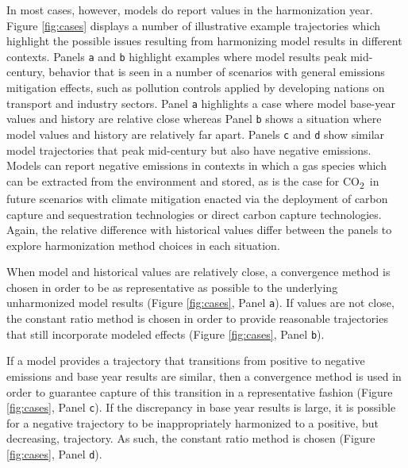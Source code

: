 \documentclass[review]{elsarticle}
\newcommand{\code}[1]{\lstinline[basicstyle=\ttfamily\color{black}]|#1|}
\newcommand{\cotwo}{CO\textsubscript{2}~}
\begin{document}
In most cases, however, models do report values in the harmonization
year. Figure \ref{fig:cases} displays a number of illustrative example
trajectories which highlight the possible issues resulting from harmonizing
model results in different contexts. Panels \code{a} and \code{b} highlight
examples where model results peak mid-century, behavior that is seen in a number
of scenarios with general emissions mitigation effects, such as pollution
controls applied by developing nations on transport and industry sectors. Panel
\code{a} highlights a case where model base-year values and history are relative
close whereas Panel \code{b} shows a situation where model values and history
are relatively far apart. Panels \code{c} and \code{d} show similar model
trajectories that peak mid-century but also have negative emissions. Models can
report negative emissions in contexts in which a gas species which can be
extracted from the environment and stored, as is the case for \cotwo in future
scenarios with climate mitigation enacted via the deployment of carbon capture
and sequestration technologies or direct carbon capture technologies. Again, the
relative difference with historical values differ between the panels to explore
harmonization method choices in each situation.

When model and historical values are relatively close, a convergence method is
chosen in order to be as representative as possible to the underlying
unharmonized model results (Figure \ref{fig:cases}, Panel \code{a}). If values
are not close, the constant ratio method is chosen in order to provide
reasonable trajectories that still incorporate modeled effects (Figure
\ref{fig:cases}, Panel \code{b}).

If a model provides a trajectory that transitions from positive to negative
emissions and base year results are similar, then a convergence method is used
in order to guarantee capture of this transition in a representative fashion
(Figure \ref{fig:cases}, Panel \code{c}). If the discrepancy in base year
results is large, it is possible for a negative trajectory to be inappropriately
harmonized to a positive, but decreasing, trajectory. As such, the constant
ratio method is chosen (Figure \ref{fig:cases}, Panel \code{d}).
\end{document}
